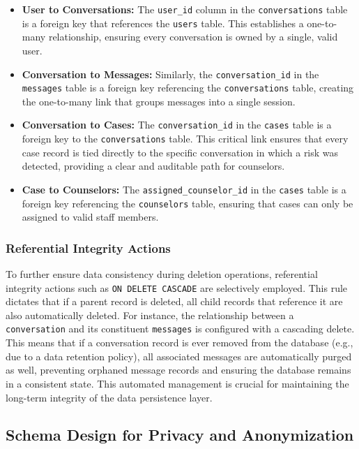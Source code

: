\begin{itemize}
    \item \textbf{User to Conversations:} The \texttt{user\_id} column in the \texttt{conversations} table is a foreign key that references the \texttt{users} table. This establishes a one-to-many relationship, ensuring every conversation is owned by a single, valid user.
    \item \textbf{Conversation to Messages:} Similarly, the \texttt{conversation\_id} in the \texttt{messages} table is a foreign key referencing the \texttt{conversations} table, creating the one-to-many link that groups messages into a single session.
    \item \textbf{Conversation to Cases:} The \texttt{conversation\_id} in the \texttt{cases} table is a foreign key to the \texttt{conversations} table. This critical link ensures that every case record is tied directly to the specific conversation in which a risk was detected, providing a clear and auditable path for counselors.
    \item \textbf{Case to Counselors:} The \texttt{assigned\_counselor\_id} in the \texttt{cases} table is a foreign key referencing the \texttt{counselors} table, ensuring that cases can only be assigned to valid staff members.
\end{itemize}

\subsubsection{Referential Integrity Actions}
To further ensure data consistency during deletion operations, referential integrity actions such as \texttt{ON DELETE CASCADE} are selectively employed. This rule dictates that if a parent record is deleted, all child records that reference it are also automatically deleted. For instance, the relationship between a \texttt{conversation} and its constituent \texttt{messages} is configured with a cascading delete. This means that if a conversation record is ever removed from the database (e.g., due to a data retention policy), all associated messages are automatically purged as well, preventing orphaned message records and ensuring the database remains in a consistent state. This automated management is crucial for maintaining the long-term integrity of the data persistence layer.

\subsection{Schema Design for Privacy and Anonymization}

